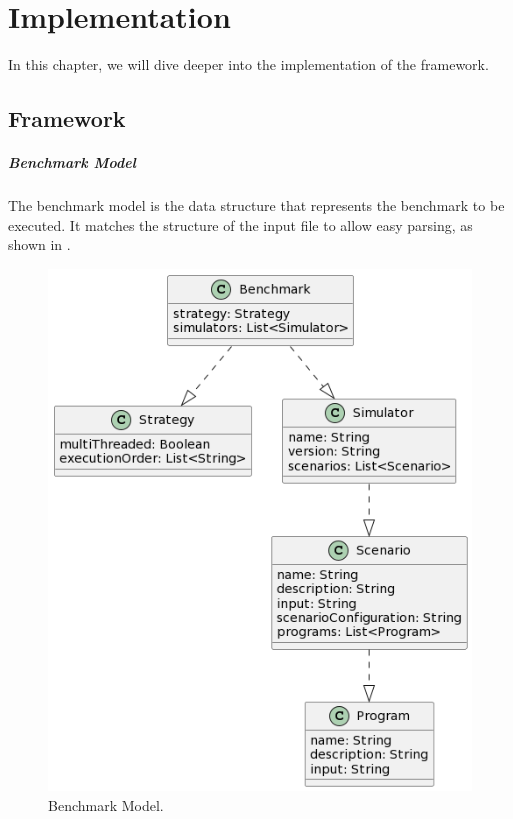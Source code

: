 \documentclass[12pt,a4paper,openright,twoside]{book}
\begin{document}
\chapter{Implementation}

In this chapter, we will dive deeper into the implementation of the framework.

\section{Framework}

\paragraph*{Benchmark Model}
The benchmark model is the data structure that represents the benchmark to be executed.
It matches the structure of the input file to allow easy parsing, as shown in .

\begin{figure}[h!]
  \centering
  \includegraphics[width=\textwidth]{figures/benchmark-model.png}
  \caption{Benchmark Model.}
  \label{fig:benchmark-model}
\end{figure}
\end{document}
